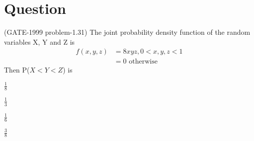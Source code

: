 \documentclass[journal,12pt,twocolumn]{IEEEtran}
\begin{document}
\section{Question}
(GATE-1999 problem-1.31) The joint probability density function of the random variables X, Y and Z is
\begin{align}
    f(x,y,z)&=8xyz, 0<x,y,z<1 \nonumber \\
    &=0 \text{ otherwise}
\end{align}
Then P($X<Y<Z$) is\\
\begin{inparaenum}[(A)]
\item $\frac{1}{8}$ \hspace{1cm}
\item $\frac{1}{3}$ \hspace{1cm}
\item $\frac{1}{6}$ \hspace{1cm}
\item $\frac{3}{8}$ \hspace{1cm}
\end{inparaenum}
\end{document}

